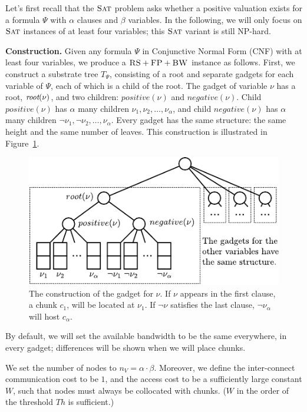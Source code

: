 \documentclass[9pt]{sigcomm-alternate}
\newcommand{\variab}{\nu}
\newcommand{\aroot}{\emph{root}}
\newcommand{\clauses}{\alpha}
\newcommand{\variables}{\beta}
\newcommand{\achunk}{\ensuremath{c}}
\newcommand{\FP}{\textsc{FP}}
\newcommand{\RS}{\textsc{RS}}
\newcommand{\BW}{\textsc{BW}}
\newcommand{\Tree}{\ensuremath{T}}
\newcommand{\Vms}{\ensuremath{n_V}}
\newcommand{\SAT}{\textsc{Sat}}
\newcommand{\Formula}{\ensuremath{\Psi}}
\newcommand{\Thr}{\ensuremath{Th}}
\newcommand{\positive}{\ensuremath{positive}}
\newcommand{\negative}{\ensuremath{negative}}
\begin{document}
\begin{appendix}
Let's first recall that the $\SAT$ problem asks whether a positive valuation exists
for a formula $\Formula$ with $\clauses$ clauses and $\variables$ variables.
In the following, we will only focus on $\SAT$ instances of at least four variables;
this $\SAT$ variant is still NP-hard.

\textbf{Construction.}
Given any formula $\Formula$ in Conjunctive Normal Form (CNF) with at least four variables, we produce
a $\RS+\FP+\BW$ instance as follows. First, we construct a substrate tree $\Tree_{\Formula}$, consisting of
a root and separate gadgets for each variable of $\Formula$, each of which
is a child of the root.
The gadget of variable $\variab$ has a root, $\aroot(\variab)$, and two children:
$\positive(\variab)$ and $\negative(\variab)$. Child $\positive(\variab)$ has $\clauses$
many children $\nu_1, \nu_2, \ldots, \nu_{\clauses}$, and child
$\negative(\variab)$ has
$\clauses$ many children $\neg \nu_1, \neg \nu_2, \dots, \nu_{\clauses}$. Every
gadget has the same structure: the same height and the same number of
leaves. This construction is illustrated in
Figure~\ref{fig:construction_3sat}.


\begin{figure}
\includegraphics[width=\columnwidth]{figs/construction_3sat}
\caption{The construction of the gadget for $\nu$. If $\nu$ appears in the
first clause, a chunk $\achunk_1$, will be located at $\nu_1$. If $\neg \nu$
satisfies the last clause, $\neg
\nu_\alpha$ will host $\achunk_\alpha$.}
\label{fig:construction_3sat}
\end{figure}


By default, we will set the available
bandwidth to be the
same everywhere, in every gadget; differences will be shown when we
will place chunks.

We set the number of nodes to $\Vms = \clauses \cdot \variables$.
Moreover, we define the inter-connect communication cost to be $1$,
and the access cost to be a sufficiently large constant $W$,
such that nodes must always be collocated with chunks. ($W$ in the order of
the threshold $\Thr$ is sufficient.)


\end{appendix}
\end{document}

